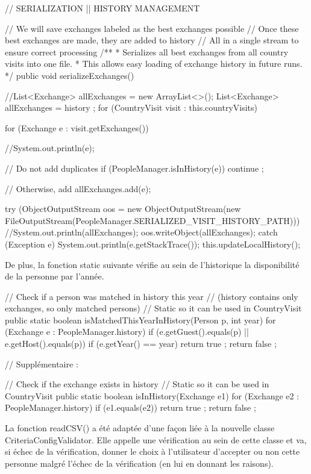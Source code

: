 \documentclass{mytex}
\begin{document}
\begin{codebox}
// SERIALIZATION || HISTORY MANAGEMENT

// We will save exchanges labeled as the best exchanges possible
// Once these best exchanges are made, they are added to history
// All in a single stream to ensure correct processing
/**
* Serializes all best exchanges from all country visits into one file.
* This allows easy loading of exchange history in future runs.
*/
public void serializeExchanges() {
	//List<Exchange> allExchanges = new ArrayList<>();
	List<Exchange> allExchanges = history ;
	for (CountryVisit visit : this.countryVisits) {
		for (Exchange e : visit.getExchanges()) {
			//System.out.println(e);
			
			// Do not add duplicates
			if (PeopleManager.isInHistory(e)) continue ;
			
			// Otherwise, add
			allExchanges.add(e);
		}
	}
	try (ObjectOutputStream oos = new ObjectOutputStream(new FileOutputStream(PeopleManager.SERIALIZED_VISIT_HISTORY_PATH))) {
		//System.out.println(allExchanges);
		oos.writeObject(allExchanges);
	} catch (Exception e) {
		System.out.println(e.getStackTrace());
	} 
	this.updateLocalHistory();
}
\end{codebox}

De plus, la fonction static suivante vérifie au sein de l'historique la disponibilité de la personne par l'année.

\begin{codebox}
// Check if a person was matched in history this year
// (history contains only exchanges, so only matched persons)
// Static so it can be used in CountryVisit
public static boolean isMatchedThisYearInHistory(Person p, int year) {
	for (Exchange e : PeopleManager.history) {
		if (e.getGuest().equals(p) || e.getHost().equals(p)) {
			if (e.getYear() == year) {
				return true ;
			}
		}
	}
	return false ;
}

// Supplémentaire :

// Check if the exchange exists in history
// Static so it can be used in CountryVisit
public static boolean isInHistory(Exchange e1) {
	for (Exchange e2 : PeopleManager.history) {
		if (e1.equals(e2)) return true ;
	}
	return false ;
}
\end{codebox}


La fonction readCSV() a été adaptée d'une façon liée à la nouvelle classe CriteriaConfigValidator. Elle appelle une vérification au sein de cette classe et va, si échec de la vérification, donner le choix à l'utilisateur d'accepter ou non cette personne malgré l'échec de la vérification (en lui en donnant les raisons).
\end{document}
